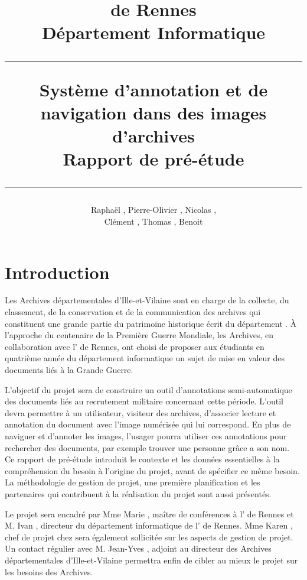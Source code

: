 \documentclass[a4paper]{article}
\title{\bsc{INSA} de Rennes \\ D\'epartement Informatique \\ \bigskip \hrule \bigskip Syst\`eme d'annotation et de navigation dans des images d'archives \\ \bigskip Rapport de pr\'e-\'etude \bigskip \hrule}
\author{Rapha\"el \bsc{Baron}, Pierre-Olivier \bsc{Bouteau}, Nicolas \bsc{Charpentier}, \\ Cl\'ement \bsc{Leboullenger}, Thomas \bsc{Fran\c{c}ois}, Benoit \bsc{Travers}}
\begin{document}
\maketitle
\thispagestyle{empty}
\newpage

\tableofcontents
\thispagestyle{empty}
\newpage

\section{Introduction}

	Les Archives d\'epartementales d'Ille-et-Vilaine sont en charge de la collecte, du classement, de la conservation et de la communication des archives qui constituent une grande partie du patrimoine historique \'ecrit du d\'epartement \cite{archive35}. 
\`A l'approche du centenaire de la Premi\`ere Guerre Mondiale, les Archives, en collaboration avec l' de Rennes, ont choisi de proposer aux \'etudiants en quatri\`eme ann\'ee du d\'epartement informatique un sujet de mise en valeur des documents li\'es \`a la Grande Guerre.

	L'objectif du projet sera de construire un outil d'annotations semi-auto\-matique des documents li\'es au recrutement militaire concernant cette p\'eriode. L'outil devra permettre \`a un utilisateur, visiteur des archives, d'associer lecture et annotation du document avec l'image num\'eris\'ee qui lui correspond. En plus de naviguer et d'annoter les images, l'usager pourra utiliser ces annotations pour rechercher des documents, par exemple trouver une personne gr\^ace a son nom.
\\

	Ce rapport de pr\'e-\'etude introduit le contexte et les donn\'ees essentielles \`a la compr\'ehension du besoin \`a l'origine du projet, avant de sp\'ecifier ce m\^eme besoin. 
La m\'ethodologie de gestion de projet, une premi\`ere planification et les partenaires qui contribuent \`a la r\'ealisation du projet sont aussi pr\'esent\'es.

	Le projet sera encadr\'e par Mme Marie , ma\^itre de conf\'erences \`a l' de Rennes et M. Ivan , directeur du d\'epartement informatique de l' de Rennes. 
Mme Karen , chef de projet chez  sera \'egalement sollicit\'ee sur les aspects de gestion de projet. 
Un contact r\'egulier avec M. Jean-Yves , adjoint au directeur des Archives d\'epartementales d'Ille-et-Vilaine permettra enfin de cibler au mieux le projet sur les besoins des Archives.
\\
\end{document}
